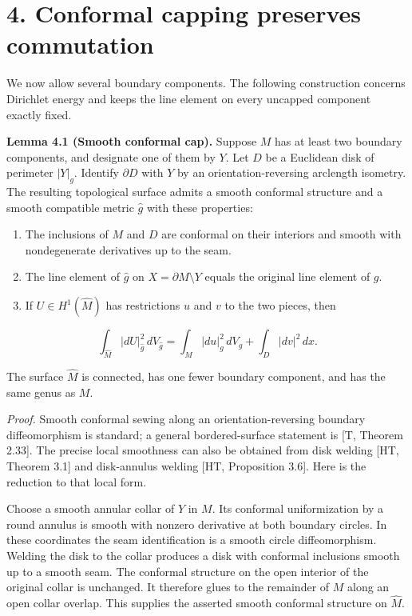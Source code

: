 \documentclass[11pt]{article}
\providecommand{\tightlist}{\setlength{\itemsep}{0pt}\setlength{\parskip}{0pt}}
\begin{document}
\section{4. Conformal capping preserves
commutation}\label{conformal-capping-preserves-commutation}

We now allow several boundary components. The following construction
concerns Dirichlet energy and keeps the line element on every uncapped
component exactly fixed.

\textbf{Lemma 4.1 (Smooth conformal cap).} Suppose \(M\) has at least
two boundary components, and designate one of them by \(Y\). Let \(D\)
be a Euclidean disk of perimeter \(|Y|_g\). Identify \(\partial D\) with
\(Y\) by an orientation-reversing arclength isometry. The resulting
topological surface admits a smooth conformal structure and a smooth
compatible metric \(\widehat g\) with these properties:

\begin{enumerate}
\def\labelenumi{\arabic{enumi}.}
\tightlist
\item
  The inclusions of \(M\) and \(D\) are conformal on their interiors and
  smooth with nondegenerate derivatives up to the seam.
\item
  The line element of \(\widehat g\) on \(X=\partial M\setminus Y\)
  equals the original line element of \(g\).
\item
  If \(U\in H^1(\widehat M)\) has restrictions \(u\) and \(v\) to the
  two pieces, then
\end{enumerate}

\[
\int_{\widehat M}|dU|_{\widehat g}^2\,dV_{\widehat g}
=\int_M|du|_g^2\,dV_g+\int_D|dv|^2\,dx.
\tag{4.1}
\]

The surface \(\widehat M\) is connected, has one fewer boundary
component, and has the same genus as \(M\).

\emph{Proof.} Smooth conformal sewing along an orientation-reversing
boundary diffeomorphism is standard; a general bordered-surface
statement is {[}T, Theorem 2.33{]}. The precise local smoothness can
also be obtained from disk welding {[}HT, Theorem 3.1{]} and
disk-annulus welding {[}HT, Proposition 3.6{]}. Here is the reduction to
that local form.

Choose a smooth annular collar of \(Y\) in \(M\). Its conformal
uniformization by a round annulus is smooth with nonzero derivative at
both boundary circles. In these coordinates the seam identification is a
smooth circle diffeomorphism. Welding the disk to the collar produces a
disk with conformal inclusions smooth up to a smooth seam. The conformal
structure on the open interior of the original collar is unchanged. It
therefore glues to the remainder of \(M\) along an open collar overlap.
This supplies the asserted smooth conformal structure on \(\widehat M\).
\end{document}
